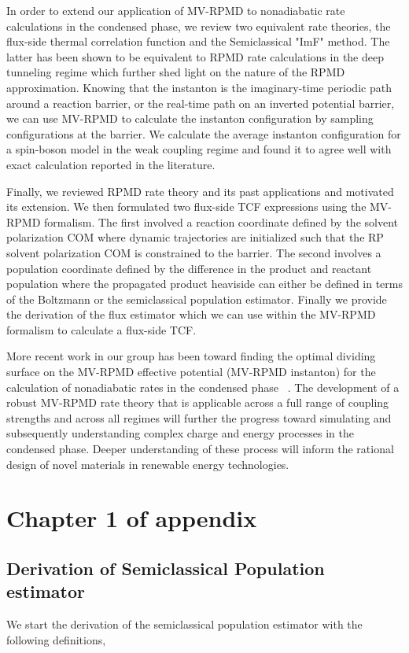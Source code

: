 \documentclass[phd,tocprelim]{cornell}
\begin{document}
In order to extend our application of MV-RPMD to nonadiabatic rate calculations in the condensed phase, we review two equivalent rate theories, the flux-side thermal correlation function and the Semiclassical "ImF" method. The latter has been shown to be equivalent to RPMD rate calculations in the deep tunneling regime which further shed light on the nature of the RPMD approximation. Knowing that the instanton is the imaginary-time periodic path around a reaction barrier, or the real-time path on an inverted potential barrier, we can use MV-RPMD to calculate the instanton configuration by sampling configurations at the barrier. We calculate the average instanton configuration for a spin-boson model in the weak coupling regime and found it to agree well with exact calculation reported in the literature. 

Finally, we reviewed RPMD rate theory and its past applications and motivated its extension. We then formulated two flux-side TCF expressions using the MV-RPMD formalism. The first involved a reaction coordinate defined by the solvent polarization COM where  dynamic trajectories are initialized such that the RP solvent polarization COM is constrained to the barrier. The second involves a population coordinate defined by the difference in the product and reactant population where the propagated product heaviside can either be defined in terms of the Boltzmann or the semiclassical population estimator. Finally we provide the derivation of the flux estimator which we can use within the MV-RPMD formalism to calculate a flux-side TCF. 


More recent work in our group has been toward finding the optimal dividing surface on the MV-RPMD effective potential (MV-RPMD instanton) for the calculation of nonadiabatic rates in the condensed phase ~\cite{SRINANTH18}. The development of a robust MV-RPMD rate theory that is applicable across a full range of coupling strengths and across all regimes will further the progress toward simulating and subsequently understanding complex charge and energy processes in the condensed phase. Deeper understanding of these process will inform the rational design of novel materials in renewable energy technologies. 
 

\appendix

\chapter{Chapter 1 of appendix}


\section{Derivation of Semiclassical Population estimator}
We start the derivation of the semiclassical population estimator with the following definitions,
\end{document}
